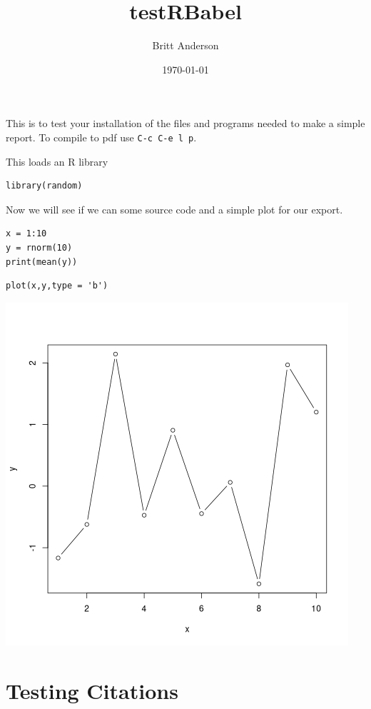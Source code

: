 \documentclass{article}
\author{Britt Anderson}
\date{\today}
\title{testRBabel}
\begin{document}
\maketitle
\tableofcontents

This is to test your installation of the files and programs needed to make a simple report. To compile to pdf use \texttt{C-c C-e l p}.

This loads an R library
\begin{verbatim}
library(random)
\end{verbatim}


Now we will see if we can some source code and a simple plot for our export.

\begin{verbatim}
x = 1:10
y = rnorm(10)
print(mean(y))
\end{verbatim}

\begin{verbatim}
plot(x,y,type = 'b')
\end{verbatim}

\begin{center}
\includegraphics[width=.9\linewidth]{simplePlot.png}
\end{center}

\section{Testing Citations}
\label{sec:orge7ea477}
\end{document}
